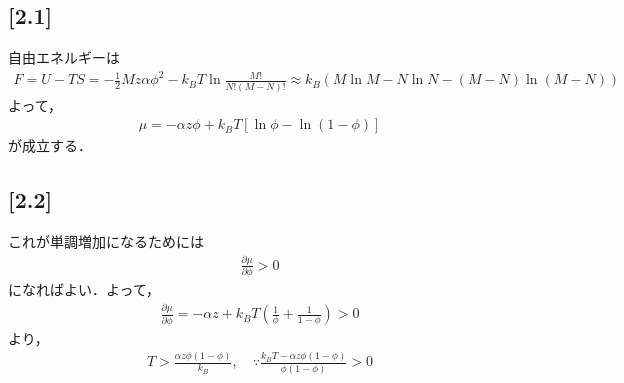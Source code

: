 \documentclass[12pt,dvipdfmx]{jsarticle}
\begin{document}
\subsection*{\large{[2.1]}}
自由エネルギーは
\begin{eqnarray}
  F = U-TS = -\frac{1}{2}Mz\alpha \phi^2 - k_B T\ln \frac{M!}{N!(M-N)!}\approx k_B \left( M\ln M - N\ln N -(M-N)\ln(M-N) \right)
\end{eqnarray}
よって，
\begin{eqnarray}
  \mu = -\alpha z\phi + k_BT \left[ \ln \phi -\ln (1-\phi) \right]
\end{eqnarray}
が成立する．
\subsection*{\large{[2.2]}}
これが単調増加になるためには
\begin{eqnarray}
  \frac{\partial \mu}{\partial\phi} >0
\end{eqnarray}
になればよい．よって，
\begin{eqnarray}
  \frac{\partial \mu}{\partial\phi} = -\alpha z + k_BT \left( \frac{1}{\phi} + \frac{1}{1-\phi} \right) >0
\end{eqnarray}
より，
\begin{eqnarray}
  T > \frac{\alpha z \phi (1-\phi)}{k_B},\quad\because \frac{k_BT -\alpha z \phi (1-\phi)}{\phi(1-\phi)}>0
\end{eqnarray}
\end{document}
